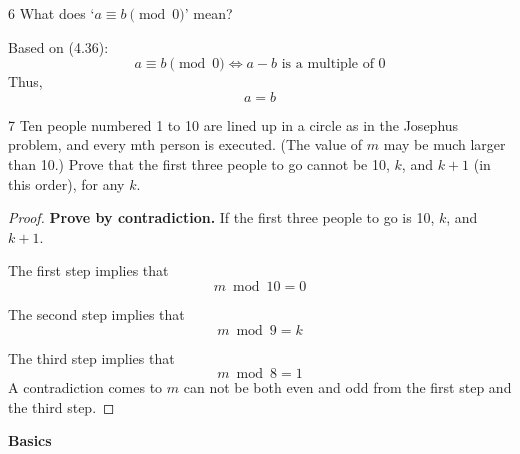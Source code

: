 \documentclass[a4paper,12pt]{article}
\makeatletter
\newtheorem*{solution}{Solution}
\theoremstyle{definition}
\renewenvironment{solution}[1][Solution] {\par\pushQED{\qed}\normalfont\topsep6\p@\@plus6\p@\relax\trivlist\item[\hskip\labelsep\bfseries#1\@addpunct{.}]\ignorespaces}{\popQED\endtrivlist\@endpefalse} \makeatother
\newenvironment{problems}{\begin{list}{}{\renewcommand{\makelabel}[1]{\textbf{##1}\hfil}}}{\end{list}}
\makeatother
\begin{document}
\begin{problems}
\begin{solution}
    \end{solution} 
    \item[6] What does `$a \equiv b\pmod 0$' mean?
    \begin{solution}
        Based on (4.36):
        \begin{equation*}
            a \equiv b\pmod 0 \Leftrightarrow a-b\text{ is a multiple of }0
        \end{equation*}
        Thus,
        \begin{equation*}
            a=b
        \end{equation*}
    \end{solution}
    \item[7] Ten people numbered 1 to 10 are lined up in a circle as in the Josephus problem,  and every mth person is executed.  (The value of $m$ may be much larger than 10.)  Prove that the first three people to go cannot be 10, $k$, and $k+1$ (in this order), for any $k$.
    \begin{proof}
        \textbf{Prove by contradiction.} If the first three people to go is 10, $k$, and $k+1$. 
        
        

        The first step implies that 
        \begin{equation*}
            m \bmod 10 = 0
        \end{equation*}

        The second step implies that
        \begin{equation*}
            m \bmod 9 = k
        \end{equation*}

        The third step implies that 
        \begin{equation*}
            m \bmod 8 = 1
        \end{equation*}
        A contradiction comes to $m$ can not be both even and odd from the first step and the third step.
    \end{proof}
\end{problems}

\noindent\textbf{Basics}
\end{document}
